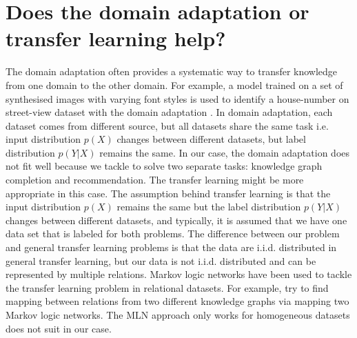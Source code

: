 \documentclass{article} %
\theoremstyle{definition}
\begin{document}
\section{Does the domain adaptation or transfer learning help?}
The domain adaptation often provides a systematic way to transfer knowledge from one domain to the other domain. For example, a model trained on a set of synthesised images with varying font styles is used to identify a house-number on street-view dataset with the domain adaptation \cite{Ganin2015}. In domain adaptation, each dataset comes from different source, but all datasets share the same task i.e. input distribution $p(X)$ changes between different datasets, but label distribution $p(Y|X)$ remains the same. In our case, the domain adaptation does not fit well because we tackle to solve two separate tasks: knowledge graph completion and recommendation. The transfer learning might be more appropriate in this case. The assumption behind transfer learning is that the input distribution $p(X)$ remains the same but the label distribution $p(Y|X)$ changes between different datasets, and typically, it is assumed that we have one data set that is labeled for both problems. The difference between our problem and general transfer learning problems is that the data are i.i.d. distributed in general transfer learning, but our data is not i.i.d. distributed and can be represented by multiple relations. Markov logic networks have been used to tackle the transfer learning problem in relational datasets. For example, \cite{Mihalkova2007} try to find mapping between relations from two different knowledge graphs via mapping two Markov logic networks. The MLN approach only works for homogeneous datasets does not suit in our case.




\end{document}
